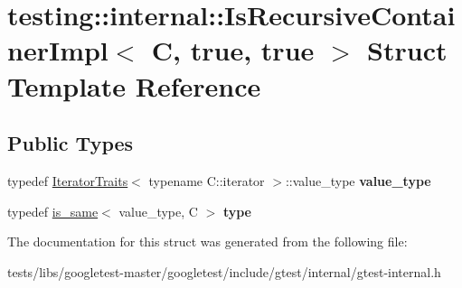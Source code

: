 \hypertarget{structtesting_1_1internal_1_1IsRecursiveContainerImpl_3_01C_00_01true_00_01true_01_4}{}\section{testing\+:\+:internal\+:\+:Is\+Recursive\+Container\+Impl$<$ C, true, true $>$ Struct Template Reference}
\label{structtesting_1_1internal_1_1IsRecursiveContainerImpl_3_01C_00_01true_00_01true_01_4}
\subsection*{Public Types}
\begin{DoxyCompactItemize}
\item 
\mbox{\label{structtesting_1_1internal_1_1IsRecursiveContainerImpl_3_01C_00_01true_00_01true_01_4_a8bbf5f5dec769e84b6f5a2e1fdb503e8}} 
typedef \hyperlink{structtesting_1_1internal_1_1IteratorTraits}{Iterator\+Traits}$<$ typename C\+::iterator $>$\+::value\+\_\+type {\bfseries value\+\_\+type}
\item 
\mbox{\label{structtesting_1_1internal_1_1IsRecursiveContainerImpl_3_01C_00_01true_00_01true_01_4_a6bf4fa07dd1c22c5d0ca4ed99c546e9c}} 
typedef \hyperlink{structtesting_1_1internal_1_1is__same}{is\+\_\+same}$<$ value\+\_\+type, C $>$ {\bfseries type}
\end{DoxyCompactItemize}


The documentation for this struct was generated from the following file\+:\begin{DoxyCompactItemize}
\item 
tests/libs/googletest-\/master/googletest/include/gtest/internal/gtest-\/internal.\+h\end{DoxyCompactItemize}
